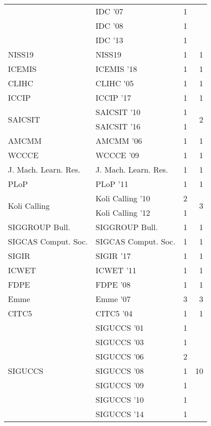 \begin{table*}[t]
\begin{tabular}{llrr}
& IDC '07 & 1 &\\
& IDC '08 & 1 &\\
& IDC '13 & 1 &\\
\multirow{1}{*}{NISS19} & NISS19 & 1 & \multirow{1}{*}{1}\\
\multirow{1}{*}{ICEMIS } & ICEMIS '18 & 1 & \multirow{1}{*}{1}\\
\multirow{1}{*}{CLIHC } & CLIHC '05 & 1 & \multirow{1}{*}{1}\\
\multirow{1}{*}{ICCIP } & ICCIP '17 & 1 & \multirow{1}{*}{1}\\
\multirow{2}{*}{SAICSIT } & SAICSIT '10 & 1 & \multirow{2}{*}{2}\\
& SAICSIT '16 & 1 &\\
\multirow{1}{*}{AMCMM } & AMCMM '06 & 1 & \multirow{1}{*}{1}\\
\multirow{1}{*}{WCCCE } & WCCCE '09 & 1 & \multirow{1}{*}{1}\\
\multirow{1}{*}{J. Mach. Learn. Res.} & J. Mach. Learn. Res. & 1 & \multirow{1}{*}{1}\\
\multirow{1}{*}{PLoP } & PLoP '11 & 1 & \multirow{1}{*}{1}\\
\multirow{2}{*}{Koli Calling } & Koli Calling '10 & 2 & \multirow{2}{*}{3}\\
& Koli Calling '12 & 1 &\\
\multirow{1}{*}{SIGGROUP Bull.} & SIGGROUP Bull. & 1 & \multirow{1}{*}{1}\\
\multirow{1}{*}{SIGCAS Comput. Soc.} & SIGCAS Comput. Soc. & 1 & \multirow{1}{*}{1}\\
\multirow{1}{*}{SIGIR } & SIGIR '17 & 1 & \multirow{1}{*}{1}\\
\multirow{1}{*}{ICWET } & ICWET '11 & 1 & \multirow{1}{*}{1}\\
\multirow{1}{*}{FDPE } & FDPE '08 & 1 & \multirow{1}{*}{1}\\
\multirow{1}{*}{Emme } & Emme '07 & 3 & \multirow{1}{*}{3}\\
\multirow{1}{*}{CITC5 } & CITC5 '04 & 1 & \multirow{1}{*}{1}\\
\multirow{9}{*}{SIGUCCS } & SIGUCCS '01 & 1 & \multirow{9}{*}{10}\\
& SIGUCCS '03 & 1 &\\
& SIGUCCS '06 & 2 &\\
& SIGUCCS '08 & 1 &\\
& SIGUCCS '09 & 1 &\\
& SIGUCCS '10 & 1 &\\
& SIGUCCS '14 & 1 &\\

\end{tabular}
\end{table*}
